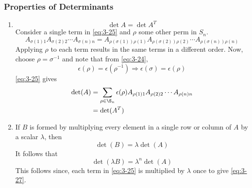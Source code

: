 \documentclass{article}
\numberwithin{equation}{section}
\begin{document}
\subsubsection{Properties of Determinants}
    \begin{enumerate}
        \item \begin{equation}\label{eq:3-26}
            \det A = \det A^T
        \end{equation}
        Consider a single term in \eqref{eq:3-25} and $\rho$ some other perm in $S_n$. 
        \[
            A_{\sigma(1)1}A_{\sigma(2)2} \cdots A_{\sigma(n)n} = A_{\rho(\sigma(1))\rho(1)}A_{\rho(\sigma(2))\rho(2)} \cdots A_{\rho(\sigma(n))\rho(n)}
        \]
        Applying $\rho$ to each term results in the same terms in a different order.
        Now, choose $\rho = \sigma^{-1}$ and note that from \eqref{eq:3-24},
        \[
            \epsilon(\rho) = \epsilon(\rho^{-1}) \Rightarrow \epsilon(\sigma) = \epsilon(\rho)
        \]
        \eqref{eq:3-25} gives 
        \begin{align*}
            \det(A) &= \sum_{\rho \in \S_n} \epsilon(\rho) A_{\rho(1)1}A_{\rho(2)2} \cdots A_{\rho(n)n} \\
            &= \det(A^T)
        \end{align*}

        \item If $B$ is formed by multiplying every element in a single row or column of $A$ by a scalar $\lambda$, then
        \begin{equation}\label{eq:3-27}
            \det (B) = \lambda \det (A)
        \end{equation}
        It follows that 
        \begin{equation}\label{eq:3-28}
            \det(\lambda B) = \lambda^n \det(A)
        \end{equation}
        This follows since, each term in \eqref{eq:3-25} is multiplied by $\lambda$ once to give \eqref{eq:3-27}.


\end{enumerate}
\end{document}
